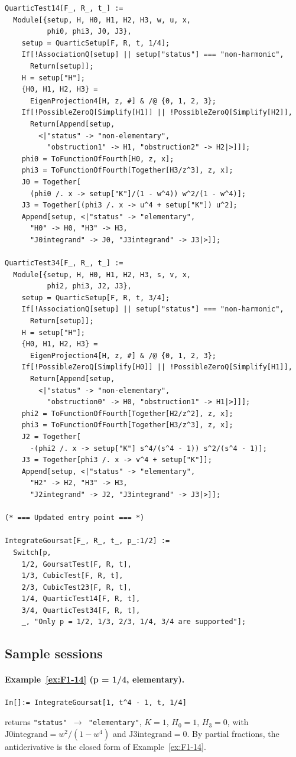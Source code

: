 \documentclass[11pt,a4paper]{article}
\theoremstyle{plain}
\theoremstyle{definition}
\theoremstyle{remark}
\begin{document}
\begin{lstlisting}
QuarticTest14[F_, R_, t_] :=
  Module[{setup, H, H0, H1, H2, H3, w, u, x,
          phi0, phi3, J0, J3},
    setup = QuarticSetup[F, R, t, 1/4];
    If[!AssociationQ[setup] || setup["status"] === "non-harmonic",
      Return[setup]];
    H = setup["H"];
    {H0, H1, H2, H3} =
      EigenProjection4[H, z, #] & /@ {0, 1, 2, 3};
    If[!PossibleZeroQ[Simplify[H1]] || !PossibleZeroQ[Simplify[H2]],
      Return[Append[setup,
        <|"status" -> "non-elementary",
          "obstruction1" -> H1, "obstruction2" -> H2|>]]];
    phi0 = ToFunctionOfFourth[H0, z, x];
    phi3 = ToFunctionOfFourth[Together[H3/z^3], z, x];
    J0 = Together[
      (phi0 /. x -> setup["K"]/(1 - w^4)) w^2/(1 - w^4)];
    J3 = Together[(phi3 /. x -> u^4 + setup["K"]) u^2];
    Append[setup, <|"status" -> "elementary",
      "H0" -> H0, "H3" -> H3,
      "J0integrand" -> J0, "J3integrand" -> J3|>]];

QuarticTest34[F_, R_, t_] :=
  Module[{setup, H, H0, H1, H2, H3, s, v, x,
          phi2, phi3, J2, J3},
    setup = QuarticSetup[F, R, t, 3/4];
    If[!AssociationQ[setup] || setup["status"] === "non-harmonic",
      Return[setup]];
    H = setup["H"];
    {H0, H1, H2, H3} =
      EigenProjection4[H, z, #] & /@ {0, 1, 2, 3};
    If[!PossibleZeroQ[Simplify[H0]] || !PossibleZeroQ[Simplify[H1]],
      Return[Append[setup,
        <|"status" -> "non-elementary",
          "obstruction0" -> H0, "obstruction1" -> H1|>]]];
    phi2 = ToFunctionOfFourth[Together[H2/z^2], z, x];
    phi3 = ToFunctionOfFourth[Together[H3/z^3], z, x];
    J2 = Together[
      -(phi2 /. x -> setup["K"] s^4/(s^4 - 1)) s^2/(s^4 - 1)];
    J3 = Together[phi3 /. x -> v^4 + setup["K"]];
    Append[setup, <|"status" -> "elementary",
      "H2" -> H2, "H3" -> H3,
      "J2integrand" -> J2, "J3integrand" -> J3|>]];

(* === Updated entry point === *)

IntegrateGoursat[F_, R_, t_, p_:1/2] :=
  Switch[p,
    1/2, GoursatTest[F, R, t],
    1/3, CubicTest[F, R, t],
    2/3, CubicTest23[F, R, t],
    1/4, QuarticTest14[F, R, t],
    3/4, QuarticTest34[F, R, t],
    _, "Only p = 1/2, 1/3, 2/3, 1/4, 3/4 are supported"];
\end{lstlisting}

\subsection*{Sample sessions}

\paragraph{Example~\ref{ex:F1-14} (p = 1/4, elementary).}
\begin{lstlisting}[basicstyle=\footnotesize\ttfamily,frame=none]
In[]:= IntegrateGoursat[1, t^4 - 1, t, 1/4]
\end{lstlisting}
returns \texttt{"status"\,$\to$\,"elementary"}, $K = 1$, $H_0 = 1$, $H_3 = 0$, with $\text{J0integrand} = w^2/(1-w^4)$ and $\text{J3integrand} = 0$. By partial fractions, the antiderivative is the closed form of Example~\ref{ex:F1-14}.
\end{document}
